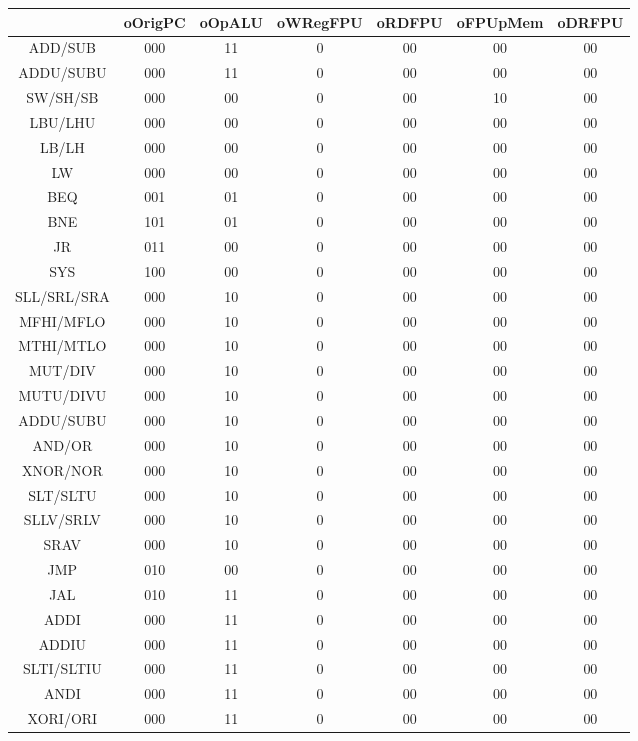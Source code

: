 \documentclass[12pt]{article}
\begin{document}
\begin{longtable}{|c|c|c|c|c|c|c|}
		\hline
		& oOrigPC & oOpALU & oWRegFPU & oRDFPU & oFPUpMem & oDRFPU\\\hline
		ADD/SUB & 000 & 11 & 0 & 00 & 00 & 00\\\hline	
		ADDU/SUBU & 000 & 11 & 0 & 00 & 00 & 00\\\hline
		SW/SH/SB & 000 & 00 & 0 & 00 & 10 & 00\\\hline
		LBU/LHU & 000 & 00 & 0 & 00 & 00 & 00\\\hline
		LB/LH & 000 & 00 & 0 & 00 & 00 & 00\\\hline
		LW & 000 & 00 & 0 & 00 & 00 & 00\\\hline
		BEQ & 001 & 01 & 0 & 00 & 00 & 00\\\hline	
		BNE & 101 & 01 & 0 & 00 & 00 & 00\\\hline
		JR & 011 & 00 & 0 & 00 & 00 & 00\\\hline
		SYS & 100 & 00 & 0 & 00 & 00 & 00\\\hline
		SLL/SRL/SRA & 000 & 10 & 0 & 00 & 00 & 00\\\hline
		MFHI/MFLO & 000 & 10 & 0 & 00 & 00 & 00\\\hline
		MTHI/MTLO & 000 & 10 & 0 & 00 & 00 & 00\\\hline
		MUT/DIV & 000 & 10 & 0 & 00 & 00 & 00\\\hline
		MUTU/DIVU & 000 & 10 & 0 & 00 & 00 & 00\\\hline
		ADDU/SUBU & 000 & 10 & 0 & 00 & 00 & 00\\\hline
		AND/OR & 000 & 10 & 0 & 00 & 00 & 00\\\hline
		XNOR/NOR & 000 & 10 & 0 & 00 & 00 & 00\\\hline
		SLT/SLTU & 000 & 10 & 0 & 00 & 00 & 00\\\hline
		SLLV/SRLV & 000 & 10 & 0 & 00 & 00 & 00\\\hline
		SRAV & 000 & 10 & 0 & 00 & 00 & 00\\\hline	
		JMP & 010 & 00 & 0 & 00 & 00 & 00\\\hline
		JAL & 010 & 11 & 0 & 00 & 00 & 00\\\hline
		ADDI & 000 & 11 & 0 & 00 & 00 & 00\\\hline
		ADDIU & 000 & 11 & 0 & 00 & 00 & 00\\\hline
		SLTI/SLTIU & 000 & 11 & 0 & 00 & 00 & 00\\\hline
		ANDI & 000 & 11 & 0 & 00 & 00 & 00\\\hline
		XORI/ORI & 000 & 11 & 0 & 00 & 00 & 00\\\hline

\end{longtable}
\end{document}
